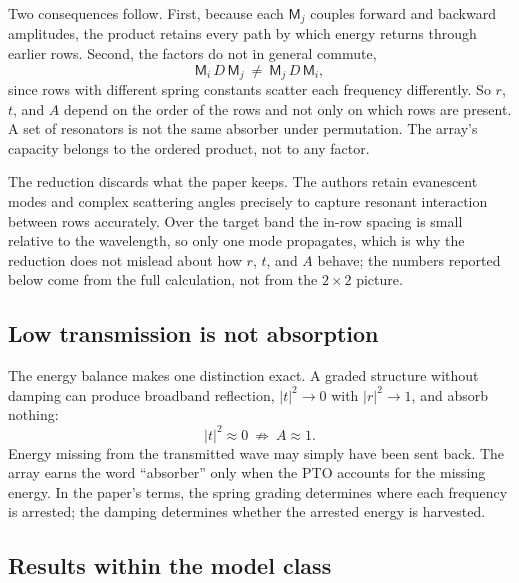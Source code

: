 \documentclass[11pt]{article}
\theoremstyle{definition}
\begin{document}
Two consequences follow. First, because each $\mathsf M_j$ couples forward and backward amplitudes, the product retains every path by which energy returns through earlier rows. Second, the factors do not in general commute,
\begin{equation}
\mathsf M_i\,D\,\mathsf M_j\ \neq\ \mathsf M_j\,D\,\mathsf M_i ,
\end{equation}
since rows with different spring constants scatter each frequency differently. So $r$, $t$, and $A$ depend on the order of the rows and not only on which rows are present. A set of resonators is not the same absorber under permutation. The array's capacity belongs to the ordered product, not to any factor.

The reduction discards what the paper keeps. The authors retain evanescent modes and complex scattering angles precisely to capture resonant interaction between rows accurately. Over the target band the in-row spacing is small relative to the wavelength, so only one mode propagates, which is why the reduction does not mislead about how $r$, $t$, and $A$ behave; the numbers reported below come from the full calculation, not from the $2\times 2$ picture.

\subsection{Low transmission is not absorption}

The energy balance makes one distinction exact. A graded structure without damping can produce broadband reflection, $|t|^{2}\to 0$ with $|r|^{2}\to 1$, and absorb nothing:
\begin{equation}
|t|^{2}\approx 0\ \not\Rightarrow\ A\approx 1 .
\end{equation}
Energy missing from the transmitted wave may simply have been sent back. The array earns the word ``absorber'' only when the PTO accounts for the missing energy. In the paper's terms, the spring grading determines where each frequency is arrested; the damping determines whether the arrested energy is harvested.

\subsection{Results within the model class}
\end{document}
